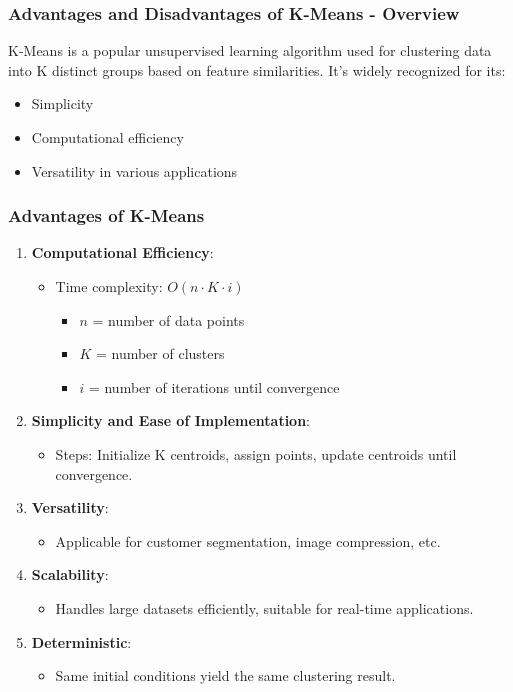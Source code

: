 \documentclass{beamer}
\begin{document}
\begin{frame}[fragile]
    \frametitle{Advantages and Disadvantages of K-Means - Overview}
    K-Means is a popular unsupervised learning algorithm used for clustering data into K distinct groups based on feature similarities. It's widely recognized for its:
    \begin{itemize}
        \item Simplicity
        \item Computational efficiency
        \item Versatility in various applications
    \end{itemize}
\end{frame}

\begin{frame}[fragile]
    \frametitle{Advantages of K-Means}
    \begin{enumerate}
        \item \textbf{Computational Efficiency}:
            \begin{itemize}
                \item Time complexity: $O(n \cdot K \cdot i)$
                    \begin{itemize}
                        \item $n$ = number of data points
                        \item $K$ = number of clusters
                        \item $i$ = number of iterations until convergence
                    \end{itemize}
            \end{itemize}

        \item \textbf{Simplicity and Ease of Implementation}:
            \begin{itemize}
                \item Steps: Initialize K centroids, assign points, update centroids until convergence.
            \end{itemize}

        \item \textbf{Versatility}:
            \begin{itemize}
                \item Applicable for customer segmentation, image compression, etc.
            \end{itemize}

        \item \textbf{Scalability}:
            \begin{itemize}
                \item Handles large datasets efficiently, suitable for real-time applications.
            \end{itemize}

        \item \textbf{Deterministic}:
            \begin{itemize}
                \item Same initial conditions yield the same clustering result.
            \end{itemize}
    \end{enumerate}
\end{frame}
\end{document}
